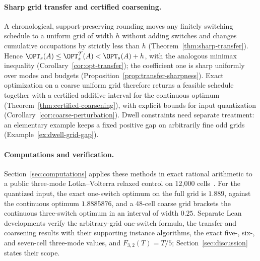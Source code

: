 \paragraph{Sharp grid transfer and certified coarsening.}
A chronological, support-preserving rounding moves any finitely switching
schedule to a uniform grid of width $h$ without adding switches and changes
cumulative occupations by strictly less than $h$
(Theorem~\ref{thm:sharp-transfer}). Hence
$\OPT_s(A)\le\OPT^{\mathcal T}_s(A)<\OPT_s(A)+h$, with the analogous
minimax inequality (Corollary~\ref{cor:opt-transfer}); the coefficient one
is sharp uniformly over modes and budgets
(Proposition~\ref{prop:transfer-sharpness}). Exact optimization on a coarse
uniform grid therefore returns a feasible schedule together with a certified
additive interval for the continuous optimum
(Theorem~\ref{thm:certified-coarsening}), with explicit bounds for input
quantization (Corollary~\ref{cor:coarse-perturbation}). Dwell constraints
need separate treatment: an elementary example keeps a fixed positive gap on
arbitrarily fine odd grids (Example~\ref{ex:dwell-grid-gap}).

\paragraph{Computations and verification.}
Section~\ref{sec:computations} applies these methods in exact rational
arithmetic to a public three-mode Lotka--Volterra relaxed control on 12,000
cells~\cite{pycombina-data}. For the quantized input, the exact one-switch
optimum on the full grid is $1.889$, against the continuous optimum
$1.8885876$, and a 48-cell coarse grid brackets the continuous three-switch
optimum in an interval of width $0.25$. Separate Lean developments verify the arbitrary-grid one-switch formula, the transfer and
coarsening results with their supporting instance algorithms, the exact
five-, six-, and seven-cell three-mode values, and $F_{3,2}(T)=T/5$;
Section~\ref{sec:discussion} states their scope.


